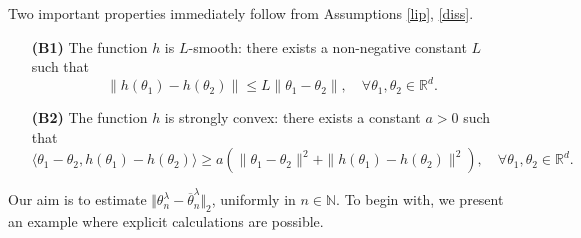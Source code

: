 \documentclass[a4paper]{article}
\begin{document}
Two important properties immediately follow from Assumptions \ref{lip}, \ref{diss}.
\begin{enumerate}
	\item[\bf(B1)] The function $h$ is $L$-smooth: there exists a non-negative constant $L$ such that
	\begin{equation}\label{B1}
	\| h(\theta_1)-h(\theta_2)\| \leq L\|\theta_1-\theta_2 \|, \quad \forall \theta_1,\theta_2 \in \mathbb{R}^{d}.
	\end{equation}
	\item[\bfseries(B2)] The function $h$ is strongly convex: there exists a constant $a>0$ such that
	\begin{equation}\label{B2}
		\langle \theta_1-\theta_2,h(\theta_1)-h(\theta_2)\rangle \geq a \left(\| \theta_1 -\theta_2 \|^2+ \| h(\theta_1) -h(\theta_2) \|^2\right), \quad \forall \theta_1,\theta_2 \in \mathbb{R}^{d}.
	\end{equation}
\end{enumerate}


Our aim is to estimate
$\Vert\theta^{\lambda}_n-\overline{\theta}^{\lambda}_n\Vert_2$,
uniformly in $n \in \mathbb{N}$. To begin with, we present an example where explicit calculations are possible.
\end{document}
